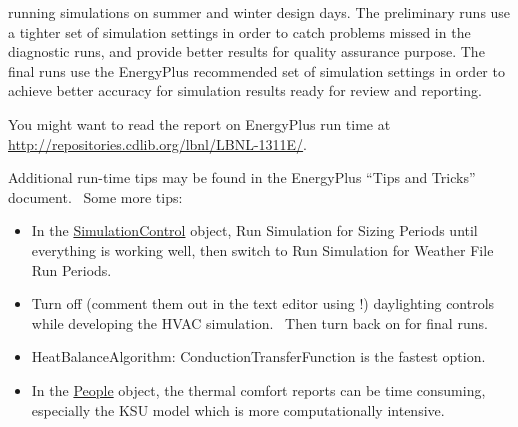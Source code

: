 running simulations on summer and winter design days. The preliminary runs use a tighter set of simulation settings in order to catch problems missed in the diagnostic runs, and provide better results for quality assurance purpose. The final runs use the EnergyPlus recommended set of simulation settings in order to achieve better accuracy for simulation results ready for review and reporting.

You might want to read the report on EnergyPlus run time at \url{http://repositories.cdlib.org/lbnl/LBNL-1311E/}.

Additional run-time tips may be found in the EnergyPlus ``Tips and Tricks'' document.~ Some more tips:

\begin{itemize}
\item
  In the \hyperref[simulationcontrol]{SimulationControl} object, Run Simulation for Sizing Periods until everything is working well, then switch to Run Simulation for Weather File Run Periods.
\item
  Turn off (comment them out in the text editor using !) daylighting controls while developing the HVAC simulation.~ Then turn back on for final runs.
\item
  HeatBalanceAlgorithm: ConductionTransferFunction is the fastest option.
\item
  In the \hyperref[people]{People} object, the thermal comfort reports can be time consuming, especially the KSU model which is more computationally intensive.
\end{itemize}